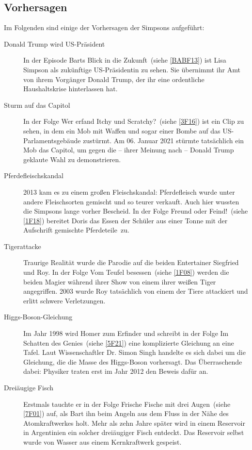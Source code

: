 \begin{appendix}
\section{Vorhersagen}\label{Vorhersagen}
Im Folgenden sind einige der Vorhersagen der Simpsons aufgeführt:

\begin{description}
  \item[Donald Trump wird US-Präsident] In der Episode \glqq Barts Blick in die Zukunft\grqq\ (siehe \ref{BABF13}) ist Lisa Simpson als zukünftige US-Präsidentin zu sehen. Sie übernimmt ihr Amt von ihrem Vorgänger Donald Trump, der ihr eine ordentliche Haushaltskrise hinterlassen hat.
  \item[Sturm auf das Capitol] In der Folge \glqq Wer erfand Itchy und Scratchy?\grqq\ (siehe \ref{3F16}) ist ein Clip zu sehen, in dem ein Mob mit Waffen und sogar einer Bombe auf das US-Par\-la\-ments\-ge\-bäu\-de zustürmt. Am 06. Januar 2021 stürmte tatsächlich ein Mob das Capitol, um gegen die -- ihrer Meinung nach -- Donald Trump geklaute Wahl zu demonstrieren.
  \item[Pferdefleischskandal] 2013 kam es zu einem großen Fleischskandal: Pferdefleisch wurde unter andere Fleischsorten gemischt und so teurer verkauft. Auch hier wussten die Simpsons lange vorher Bescheid. In der Folge \glqq Freund oder Feind!\grqq\ (siehe \ref{1F18}) bereitet Doris das Essen der Schüler aus einer Tonne mit der Aufschrift \glqq gemischte Pferdeteile\grqq\ zu.
  \item[Tigerattacke] Traurige Realität wurde die Parodie auf die beiden Entertainer Siegfried und Roy. In der Folge \glqq Vom Teufel besessen\grqq\ (siehe \ref{1F08}) werden die beiden Magier während ihrer Show von einem ihrer weißen Tiger angegriffen. 2003 wurde Roy tatsächlich von einem der Tiere attackiert und erlitt schwere Verletzungen.
  \item [Higgs-Boson-Gleichung] Im Jahr 1998 wird Homer zum Erfinder und schreibt in der Folge \glqq Im Schatten des Genies\grqq\ (siehe \ref{5F21}) eine komplizierte Gleichung an eine Tafel. Laut Wissenschaftler Dr. Simon Singh handelte es sich dabei um die Gleichung, die die Masse des Higgs-Boson vorhersagt. Das Überraschende dabei: Physiker traten erst im Jahr 2012 den Beweis dafür an.
  \item [Dreiäugige Fisch] Erstmals tauchte er in der Folge \glqq Frische Fische mit drei Augen\grqq\ (siehe \ref{7F01}) auf, als Bart ihn beim Angeln aus dem Fluss in der Nähe des Atomkraftwerkes holt. Mehr als zehn Jahre später wird in einem Reservoir in Argentinien ein solcher dreiäugiger Fisch entdeckt. Das Reservoir selbst wurde von Wasser aus einem Kernkraftwerk gespeist.

\end{description}
\end{appendix}
